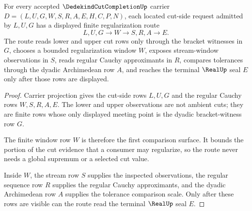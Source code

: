 \begin{theorem}
\label{thm:dedekind-cut-completion-located-regularization}
For every accepted $\DedekindCutCompletionUp$ carrier $D=(L,U,G,W,S,R,A,E,H,C,P,N)$, each located cut-side request admitted by $L,U,G$ has a displayed finite regularization route
$$
L,U,G \longrightarrow W \longrightarrow S,R,A \longrightarrow E .
$$
The route reads lower and upper cut rows only through the bracket witnesses in $G$, chooses a bounded regularization window $W$, exposes stream-window observations in $S$, reads regular Cauchy approximants in $R$, compares tolerances through the dyadic Archimedean row $A$, and reaches the terminal $\RealUp$ seal $E$ only after those rows are displayed.
\end{theorem}
\begin{proof}
Carrier projection gives the cut-side rows $L,U,G$ and the regular Cauchy rows $W,S,R,A,E$. The lower and upper observations are not ambient cuts; they are finite rows whose only displayed meeting point is the dyadic bracket-witness row $G$.

The finite window row $W$ is therefore the first comparison surface. It bounds the portion of the cut evidence that a consumer may regularize, so the route never needs a global supremum or a selected cut value.

Inside $W$, the stream row $S$ supplies the inspected observations, the regular sequence row $R$ supplies the regular Cauchy approximants, and the dyadic Archimedean row $A$ supplies the tolerance comparison scale. Only after these rows are visible can the route read the terminal $\RealUp$ seal $E$.
\end{proof}

